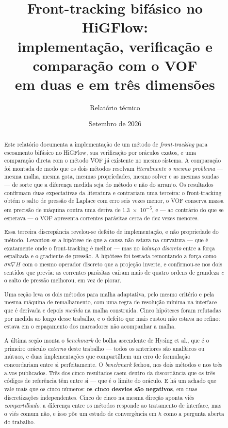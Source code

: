 \documentclass[11pt,a4paper]{article}
\title{Front-tracking bif\'asico no HiGFlow:\\
       implementa\c{c}\~ao, verifica\c{c}\~ao e compara\c{c}\~ao com o VOF\\
       \large em duas e em tr\^es dimens\~oes}
\author{Relat\'orio t\'ecnico}
\date{Setembro de 2026}
\begin{document}
\maketitle

\begin{abstract}
Este relat\'orio documenta a implementa\c{c}\~ao de um m\'etodo de
\emph{front-tracking} para escoamento bif\'asico no HiGFlow, sua verifica\c{c}\~ao
por or\'aculos exatos, e uma compara\c{c}\~ao direta com o m\'etodo VOF j\'a
existente no mesmo sistema. A compara\c{c}\~ao foi montada de modo que os dois
m\'etodos resolvam \emph{literalmente o mesmo problema} --- mesma malha, mesma
gota, mesmas propriedades, mesmo solver e as mesmas sondas --- de sorte que a
diferen\c{c}a medida seja do m\'etodo e n\~ao do arranjo. Os resultados confirmam
duas expectativas da literatura e contrariam uma terceira: o front-tracking
obt\'em o salto de press\~ao de Laplace com erro seis vezes menor, o VOF conserva
massa em precis\~ao de m\'aquina contra uma deriva de \num{1.3e-5}, e --- ao
contr\'ario do que se esperava --- o VOF apresenta correntes par\'asitas cerca de
dez vezes menores.

Essa terceira discrep\^ancia revelou-se defeito de implementa\c{c}\~ao, e n\~ao
propriedade do m\'etodo. Levantou-se a hip\'otese de que a causa n\~ao estava na
curvatura --- que \'e exatamente onde o front-tracking \'e melhor --- mas no
\emph{balan\c{c}o discreto} entre a for\c{c}a espalhada e o gradiente de press\~ao.
A hip\'otese foi testada remontando a for\c{c}a como $\sigma\kappa\nabla H$ com
o mesmo operador discreto que a proje\c{c}\~ao inverte, e confirmou-se nos dois
sentidos que previa: as correntes par\'asitas ca\'iram mais de quatro ordens de
grandeza \emph{e} o salto de press\~ao melhorou, em vez de piorar.

Uma se\c{c}\~ao leva os dois m\'etodos para malha adaptativa, pelo mesmo
crit\'erio e pela mesma m\'aquina de remalhamento, com uma regra de resolu\c{c}\~ao
m\'inima na interface que \'e derivada e depois \emph{medida} na malha
constru\'ida. Cinco hip\'oteses foram refutadas por medida ao longo desse
trabalho, e o defeito que mais custou n\~ao estava no refino: estava em o
espa\c{c}amento dos marcadores n\~ao acompanhar a malha.

A \'ultima se\c{c}\~ao monta o \emph{benchmark} de bolha ascendente de Hysing
et al., que \'e o primeiro or\'aculo \emph{externo} deste trabalho --- todos os
anteriores s\~ao anal\'iticos ou m\'utuos, e duas implementa\c{c}\~oes que
compartilhem um erro de formula\c{c}\~ao concordariam entre si perfeitamente.
O \emph{benchmark} fechou, nos dois m\'etodos e nos tr\^es alvos publicados. Tr\^es
dos cinco resultados caem dentro da discord\^ancia que os tr\^es c\'odigos de
refer\^encia t\^em entre si --- que \'e o limite do or\'aculo. E h\'a um achado que
vale mais que os cinco n\'umeros: \textbf{os cinco desvios s\~ao negativos}, em
duas discretiza\c{c}\~oes independentes. Cinco de cinco na mesma dire\c{c}\~ao
aponta vi\'es \emph{compartilhado}: a diferen\c{c}a entre os m\'etodos responde ao
tratamento de interface, mas o vi\'es comum n\~ao, e isso p\~oe um estudo de
converg\^encia em $h$ como a pergunta aberta do trabalho.


\end{abstract}
\end{document}
